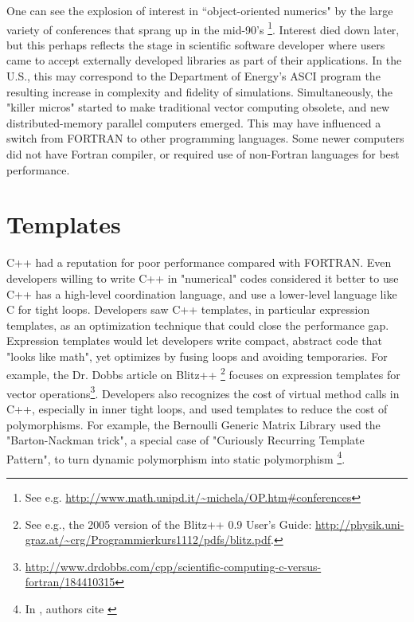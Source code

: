 One can see the explosion of interest in ``object-oriented numerics" by the large
variety of conferences that sprang up in the mid-90's \footnote{  See e.g.
\url{http://www.math.unipd.it/~michela/OP.htm#conferences}}. Interest died
down later, but this perhaps reflects the stage in scientific software developer
where users came to accept externally developed libraries as part of their
applications. In the U.S., this may correspond to the Department of Energy's
ASCI program the resulting increase in complexity and fidelity of simulations.
Simultaneously, the "killer micros" started to make traditional vector computing
obsolete, and new distributed-memory parallel computers emerged. This may have
influenced a switch from FORTRAN to other programming languages. Some newer
computers did not have Fortran compiler, or required use of non-Fortran
languages for best performance.


\section{Templates}
C++ had a reputation for poor performance compared with FORTRAN. Even developers
willing to write C++ in "numerical" codes considered it better to use C++ has a
high-level coordination language, and use a lower-level language like C for
tight loops\cite{Arge1997}. Developers saw C++ templates, in particular
expression templates, as an optimization technique that could close the
performance gap. Expression templates would let developers write compact,
abstract code that "looks like math", yet optimizes by fusing loops and avoiding
temporaries. For example, the Dr. Dobbs article on Blitz++ \footnote{ See e.g.,
  the 2005 version of the Blitz++ 0.9 User’s Guide:
\url{http://physik.uni-graz.at/~crg/Programmierkurs1112/pdfs/blitz.pdf}.  }
focuses on expression templates for vector
operations\footnote{\url{http://www.drdobbs.com/cpp/scientific-computing-c-versus-fortran/184410315}}.
Developers also recognizes the cost of virtual method calls in C++, especially
in inner tight loops, and used templates to reduce the cost of polymorphisms.
For example, the Bernoulli Generic Matrix Library used the "Barton-Nackman
trick"\cite{Barton1994}, a special case of "Curiously Recurring Template
Pattern", to turn dynamic polymorphism into static polymorphism \footnote{In
\cite{Mateev2000}, authors cite \cite{Veldhuizen2000}}.

